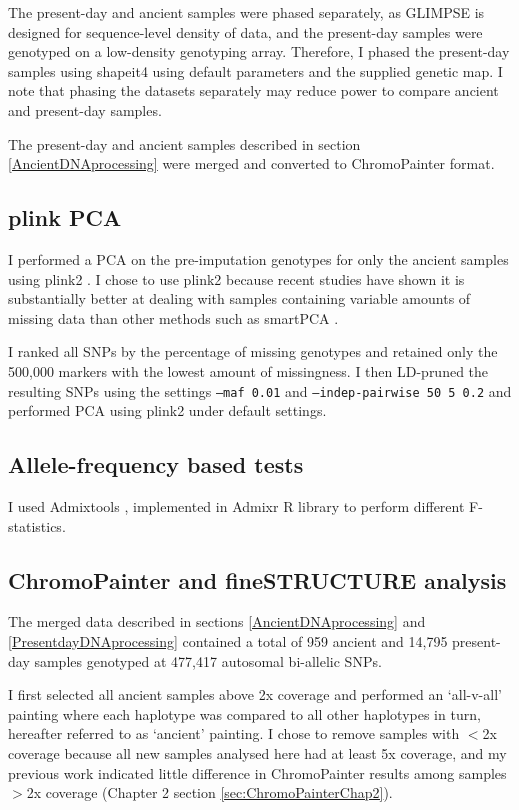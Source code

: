 The present-day and ancient samples were phased separately, as GLIMPSE is designed for sequence-level density of data, and the present-day samples were genotyped on a low-density genotyping array. Therefore, I phased the present-day samples using shapeit4 \cite{delaneau2018integrative} using default parameters and the supplied genetic map. I note that phasing the datasets separately may reduce power to compare ancient and present-day samples. 

The present-day and ancient samples described in section \ref{AncientDNAprocessing} were merged and converted to ChromoPainter format.

\subsection{plink PCA}

I performed a PCA on the pre-imputation genotypes for only the ancient samples using plink2 \cite{chang2015second}. I chose to use plink2 because recent studies have shown it is substantially better at dealing with samples containing variable amounts of missing data than other methods such as smartPCA \cite{AlbrechtsenPCAmissingness}.

I ranked all SNPs by the percentage of missing genotypes and retained only the 500,000 markers with the lowest amount of missingness. I then LD-pruned the resulting SNPs using the settings \texttt{--maf 0.01} and \texttt{--indep-pairwise 50 5 0.2} and performed PCA using plink2 under default settings. 

\subsection{Allele-frequency based tests}

I used Admixtools \cite{Patterson2012}, implemented in Admixr R library \cite{admixrpetr2019} to perform  different F-statistics.

\subsection{ChromoPainter and fineSTRUCTURE analysis}

The merged data described in sections \ref{AncientDNAprocessing} and \ref{PresentdayDNAprocessing} contained a total of 959 ancient and 14,795 present-day samples genotyped at 477,417 autosomal bi-allelic SNPs.

I first selected all ancient samples above 2x coverage and performed an `all-v-all' painting where each haplotype was compared to all other haplotypes in turn, hereafter referred to as `ancient' painting. I chose to remove samples with $<$2x coverage because all new samples analysed here had at least 5x coverage, and my previous work indicated little difference in ChromoPainter results among samples $>$2x coverage (Chapter 2 section \ref{sec:ChromoPainterChap2}). 

